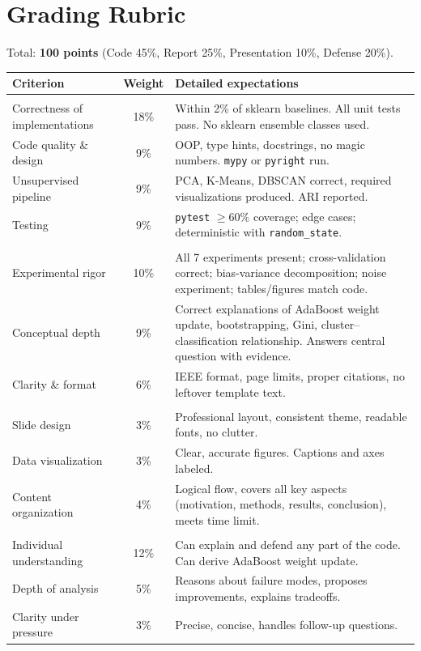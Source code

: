 \documentclass[11pt,a4paper]{article}
\begin{document}
\section{Grading Rubric}\label{sec:rubric}
Total: \textbf{100 points} (Code 45\%, Report 25\%, Presentation 10\%, Defense 20\%).
\begin{center}\small
\begin{tabular}{>{\raggedright\arraybackslash}p{4.8cm} c >{\raggedright\arraybackslash}p{8.2cm}}
\toprule
\textbf{Criterion} & \textbf{Weight} & \textbf{Detailed expectations}\\
\midrule
\multicolumn{3}{l}{\color{accent}\textbf{Code -- 45\%}}\\[2pt]
Correctness of implementations & 18\% & Within 2\% of sklearn baselines. All unit tests pass. No sklearn ensemble classes used.\\
Code quality \& design & 9\% & OOP, type hints, docstrings, no magic numbers. \texttt{mypy} or \texttt{pyright} run.\\
Unsupervised pipeline & 9\% & PCA, K-Means, DBSCAN correct, required visualizations produced. ARI reported.\\
Testing & 9\% & \texttt{pytest} $\ge 60\%$ coverage; edge cases; deterministic with \texttt{random\_state}.\\[6pt]
\multicolumn{3}{l}{\color{accent}\textbf{Report -- 25\%}}\\[2pt]
Experimental rigor & 10\% & All 7 experiments present; cross-validation correct; bias-variance decomposition; noise experiment; tables/figures match code.\\
Conceptual depth & 9\% & Correct explanations of AdaBoost weight update, bootstrapping, Gini, cluster--classification relationship. Answers central question with evidence.\\
Clarity \& format & 6\% & IEEE format, page limits, proper citations, no leftover template text.\\[6pt]
\multicolumn{3}{l}{\color{accent}\textbf{Presentation -- 10\%}}\\[2pt]
Slide design & 3\% & Professional layout, consistent theme, readable fonts, no clutter.\\
Data visualization & 3\% & Clear, accurate figures. Captions and axes labeled.\\
Content organization & 4\% & Logical flow, covers all key aspects (motivation, methods, results, conclusion), meets time limit.\\[6pt]
\multicolumn{3}{l}{\color{accent}\textbf{Defense -- 20\%}}\\[2pt]
Individual understanding & 12\% & Can explain and defend any part of the code. Can derive AdaBoost weight update.\\
Depth of analysis & 5\% & Reasons about failure modes, proposes improvements, explains tradeoffs.\\
Clarity under pressure & 3\% & Precise, concise, handles follow-up questions.\\
\bottomrule
\end{tabular}
\end{center}
\end{document}
